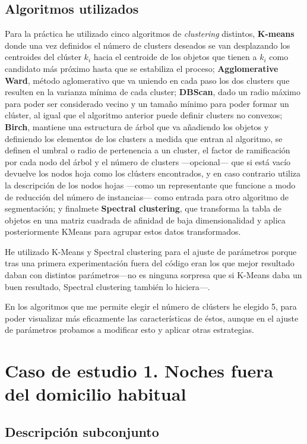 \documentclass{article}
\begin{document}
\subsection{Algoritmos utilizados}

Para la práctica he utilizado cinco algoritmos de \textit{clustering} distintos, \textbf{K-means} donde una vez definidos el número de clusters deseados se van desplazando los centroides del clúster $k_i$ hacia el centroide de los objetos que tienen a $k_i$ como candidato más próximo hasta que se estabiliza el proceso; \textbf{Agglomerative Ward}, método aglomerativo que va uniendo en cada paso los dos clusters que resulten en la varianza mínima de cada cluster; \textbf{DBScan}, dado un radio máximo para poder ser considerado vecino y un tamaño mínimo para poder formar un clúster, al igual que el algoritmo anterior puede definir clusters no convexos; \textbf{Birch}, mantiene una estructura de árbol que va añadiendo los objetos y definiendo los elementos de los clusters a medida que entran al algoritmo, se definen el umbral o radio de pertenencia a un cluster, el factor de ramificación por cada nodo del árbol y el número de clusters ---opcional--- que si está vacío devuelve los nodos hoja como los clústers encontrados, y en caso contrario utiliza la descripción de los nodos hojas ---como un representante que funcione a modo de reducción del número de instancias--- como entrada para otro algoritmo de segmentación; y finalmete \textbf{Spectral clustering}, que transforma la tabla de objetos en una matriz cuadrada de afinidad de baja dimensionalidad y aplica posteriormente KMeans para agrupar estos datos transformados.

He utilizado K-Means y Spectral clustering para el ajuste de parámetros porque tras una primera experimentación fuera del código eran los que mejor resultado daban con distintos parámetros---no es ninguna sorpresa que si K-Means daba un buen resultado, Spectral clustering también lo hiciera---.

En los algoritmos que me permite elegir el número de clústers he elegido 5, para poder visualizar más eficazmente las características de éstos, aunque en el ajuste de parámetros probamos a modificar esto y aplicar otras estrategias.

\section{Caso de estudio 1. Noches fuera del domicilio habitual}

\subsection{Descripción subconjunto}
\end{document}

